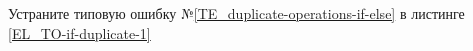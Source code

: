 Устраните типовую ошибку №\ref{TE_duplicate-operations-if-else}
в листинге \ref{EL_TO-if-duplicate-1}
